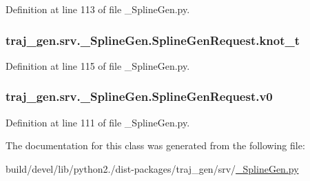 Definition at line 113 of file \+\_\+\+Spline\+Gen.\+py.

\subsubsection[{\texorpdfstring{knot\+\_\+t}{knot_t}}]{\setlength{\rightskip}{0pt plus 5cm}traj\+\_\+gen.\+srv.\+\_\+\+Spline\+Gen.\+Spline\+Gen\+Request.\+knot\+\_\+t}\hypertarget{classtraj__gen_1_1srv_1_1___spline_gen_1_1_spline_gen_request_a1436c238c429826b3035af44d2d67f77}{}\label{classtraj__gen_1_1srv_1_1___spline_gen_1_1_spline_gen_request_a1436c238c429826b3035af44d2d67f77}


Definition at line 115 of file \+\_\+\+Spline\+Gen.\+py.

\subsubsection[{\texorpdfstring{v0}{v0}}]{\setlength{\rightskip}{0pt plus 5cm}traj\+\_\+gen.\+srv.\+\_\+\+Spline\+Gen.\+Spline\+Gen\+Request.\+v0}\hypertarget{classtraj__gen_1_1srv_1_1___spline_gen_1_1_spline_gen_request_a77afe0e6b8ae07bb8b9dd4171fb74b66}{}\label{classtraj__gen_1_1srv_1_1___spline_gen_1_1_spline_gen_request_a77afe0e6b8ae07bb8b9dd4171fb74b66}


Definition at line 111 of file \+\_\+\+Spline\+Gen.\+py.



The documentation for this class was generated from the following file\+:\begin{DoxyCompactItemize}
\item 
build/devel/lib/python2./dist-\/packages/traj\+\_\+gen/srv/\hyperlink{___spline_gen_8py}{\+\_\+\+Spline\+Gen.\+py}\end{DoxyCompactItemize}
